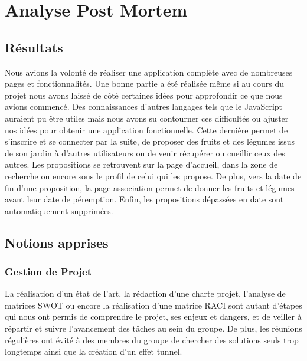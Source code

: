 \documentclass{article}
\begin{document}
\newpage
\section{Analyse Post Mortem}
\subsection{Résultats}
Nous avions la volonté de réaliser une application complète avec de nombreuses pages et fonctionnalités. Une bonne partie a été réalisée même si au cours du projet nous avons laissé de côté certaines idées pour approfondir ce que nous avions commencé. Des connaissances d'autres langages tels que le JavaScript auraient pu être utiles mais nous avons su contourner ces difficultés ou ajuster nos idées pour obtenir une application fonctionnelle. 
Cette dernière permet de s'inscrire et se connecter par la suite, de proposer des fruits et des légumes issus de son jardin à d'autres utilisateurs ou de venir récupérer ou cueillir ceux des autres. Les propositions se retrouvent sur la page d'accueil, dans la zone de recherche ou encore sous le profil de celui qui les propose. De plus, vers la date de fin d'une proposition, la page association permet de donner les fruits et légumes avant leur date de péremption. Enfin, les propositions dépassées en date sont automatiquement supprimées.

\subsection{Notions apprises}
    \subsubsection{Gestion de Projet}
    La réalisation d'un état de l'art, la rédaction d'une charte projet, l'analyse de matrices SWOT ou encore la réalisation d'une matrice RACI sont autant d'étapes qui nous ont permis de comprendre le projet, ses enjeux et dangers, et de veiller à répartir et suivre l'avancement des tâches au sein du groupe.
    De plus, les réunions régulières ont évité à des membres du groupe de chercher des solutions seuls trop longtemps ainsi que la création d'un effet tunnel.
\end{document}
